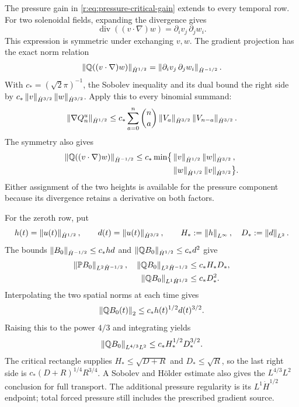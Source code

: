 The pressure gain in \eqref{r:eq:pressure-critical-gain} extends to every
temporal row.  For two solenoidal fields, expanding the divergence gives
\[
 \operatorname{div}((v\cdot\nabla)w)
 =\partial_i v_j\,\partial_j w_i.
\]
This expression is symmetric under exchanging \(v,w\).  The gradient
projection has the exact norm relation
\[
 \left\lVert \mathbb Q((v\cdot\nabla)w)\right\rVert_{\dot H^{1/2}}
 =\left\lVert \partial_i v_j\,\partial_j w_i\right\rVert_{\dot H^{-1/2}}.
\]
With \(c_*=(\sqrt2\pi)^{-1}\), the Sobolev inequality and its dual
bound the right side by
\(c_*\left\lVert v\right\rVert_{\dot H^{3/2}}\left\lVert w\right\rVert_{\dot H^{3/2}}\).
Apply this to every binomial summand:
\begin{equation}
 \left\lVert \nabla Q_n^u\right\rVert_{\dot H^{1/2}}
 \le c_*\sum_{a=0}^n\binom na
 \left\lVert V_a\right\rVert_{\dot H^{3/2}}\left\lVert V_{n-a}\right\rVert_{\dot H^{3/2}}.
 \label{r:eq:pressure-all-temporal-endpoint}
\end{equation}
The symmetry also gives
\begin{equation}
 \begin{aligned}
 \left\lVert \mathbb Q((v\cdot\nabla)w)\right\rVert_{\dot H^{-1/2}}
 \le c_*\min\bigl\{&
 \left\lVert v\right\rVert_{\dot H^{1/2}}\left\lVert w\right\rVert_{\dot H^{3/2}},\\
 &\left\lVert w\right\rVert_{\dot H^{1/2}}\left\lVert v\right\rVert_{\dot H^{3/2}}\bigr\}.
 \end{aligned}
 \label{r:eq:pressure-factor-exchange}
\end{equation}
Either assignment of the two heights is available for the pressure
component because its divergence retains a derivative on both factors.

For the zeroth row, put
\[
 h(t)=\left\lVert u(t)\right\rVert_{\dot H^{1/2}},\qquad
 d(t)=\left\lVert u(t)\right\rVert_{\dot H^{3/2}},\qquad
 H_*:=\left\lVert h\right\rVert_{L^\infty},\quad D_*:=\left\lVert d\right\rVert_{L^2}.
\]
The bounds \(\left\lVert B_0\right\rVert_{\dot H^{-1/2}}\le c_*hd\) and
\(\left\lVert \mathbb QB_0\right\rVert_{\dot H^{1/2}}\le c_*d^2\) give
\begin{equation}
 \begin{aligned}
 \left\lVert \mathbb P B_0\right\rVert_{L^2\dot H^{-1/2}},\quad
 \left\lVert \mathbb QB_0\right\rVert_{L^2\dot H^{-1/2}}
 &\le c_*H_*D_*,\\
 \left\lVert \mathbb QB_0\right\rVert_{L^1\dot H^{1/2}}
 &\le c_*D_*^2.
 \end{aligned}
 \label{r:eq:pressure-time-endpoints}
\end{equation}
Interpolating the two spatial norms at each time gives
\[
 \left\lVert \mathbb QB_0(t)\right\rVert_2
 \le c_*h(t)^{1/2}d(t)^{3/2}.
\]
Raising this to the power \(4/3\) and integrating yields
\begin{equation}
 \left\lVert \mathbb QB_0\right\rVert_{L^{4/3}L^2}
 \le c_*H_*^{1/2}D_*^{3/2}.
 \label{r:eq:pressure-intermediate-time}
\end{equation}
The critical rectangle supplies \(H_*\le\sqrt{D+R}\) and
\(D_*\le\sqrt R\), so the last right side is
\(c_*(D+R)^{1/4}R^{3/4}\).  A Sobolev and H\"older estimate also
gives the \(L^{4/3}L^2\) conclusion for full transport.  The additional
pressure regularity is its \(L^1\dot H^{1/2}\) endpoint; total forced
pressure still includes the prescribed gradient source.

